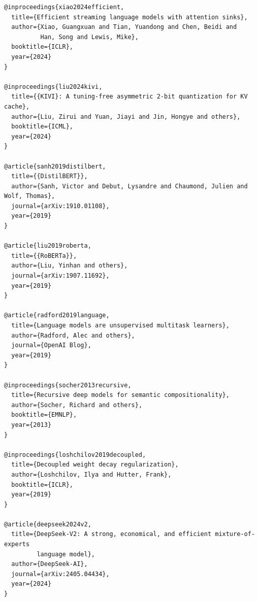 \begin{lstlisting}
@inproceedings{xiao2024efficient,
  title={Efficient streaming language models with attention sinks},
  author={Xiao, Guangxuan and Tian, Yuandong and Chen, Beidi and 
          Han, Song and Lewis, Mike},
  booktitle={ICLR},
  year={2024}
}

@inproceedings{liu2024kivi,
  title={{KIVI}: A tuning-free asymmetric 2-bit quantization for KV cache},
  author={Liu, Zirui and Yuan, Jiayi and Jin, Hongye and others},
  booktitle={ICML},
  year={2024}
}

@article{sanh2019distilbert,
  title={{DistilBERT}},
  author={Sanh, Victor and Debut, Lysandre and Chaumond, Julien and Wolf, Thomas},
  journal={arXiv:1910.01108},
  year={2019}
}

@article{liu2019roberta,
  title={{RoBERTa}},
  author={Liu, Yinhan and others},
  journal={arXiv:1907.11692},
  year={2019}
}

@article{radford2019language,
  title={Language models are unsupervised multitask learners},
  author={Radford, Alec and others},
  journal={OpenAI Blog},
  year={2019}
}

@inproceedings{socher2013recursive,
  title={Recursive deep models for semantic compositionality},
  author={Socher, Richard and others},
  booktitle={EMNLP},
  year={2013}
}

@inproceedings{loshchilov2019decoupled,
  title={Decoupled weight decay regularization},
  author={Loshchilov, Ilya and Hutter, Frank},
  booktitle={ICLR},
  year={2019}
}

@article{deepseek2024v2,
  title={DeepSeek-V2: A strong, economical, and efficient mixture-of-experts 
         language model},
  author={DeepSeek-AI},
  journal={arXiv:2405.04434},
  year={2024}
}
\end{lstlisting}